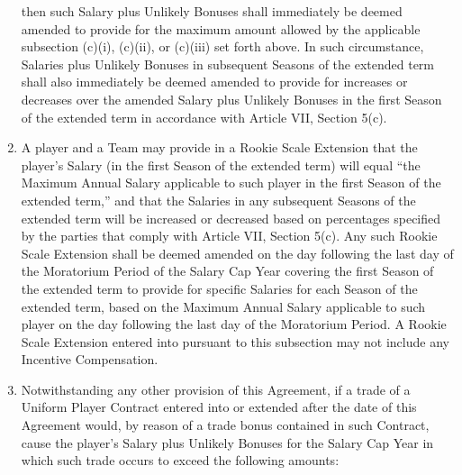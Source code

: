 \documentclass[
]{book}
\begin{document}
\begin{enumerate}
  then such Salary plus Unlikely Bonuses shall immediately be deemed amended to provide for the maximum amount allowed by the applicable subsection (c)(i), (c)(ii), or (c)(iii) set forth above. In such circumstance, Salaries plus Unlikely Bonuses in subsequent Seasons of the extended term shall also immediately be deemed amended to provide for increases or decreases over the amended Salary plus Unlikely Bonuses in the first Season of the extended term in accordance with Article VII, Section 5(c).
\item
  A player and a Team may provide in a Rookie Scale Extension that the player's Salary (in the first Season of the extended term) will equal ``the Maximum Annual Salary applicable to such player in the first Season of the extended term,'' and that the Salaries in any subsequent Seasons of the extended term will be increased or decreased based on percentages specified by the parties that comply with Article VII, Section 5(c). Any such Rookie Scale Extension shall be deemed amended on the day following the last day of the Moratorium Period of the Salary Cap Year covering the first Season of the extended term to provide for specific Salaries for each Season of the extended term, based on the Maximum Annual Salary applicable to such player on the day following the last day of the Moratorium Period. A Rookie Scale Extension entered into pursuant to this subsection may not include any Incentive Compensation.
\item
  Notwithstanding any other provision of this Agreement, if a trade of a Uniform Player Contract entered into or extended after the date of this Agreement would, by reason of a trade bonus contained in such Contract, cause the player's Salary plus Unlikely Bonuses for the Salary Cap Year in which such trade occurs to exceed the following amounts:


\end{enumerate}
\end{document}
